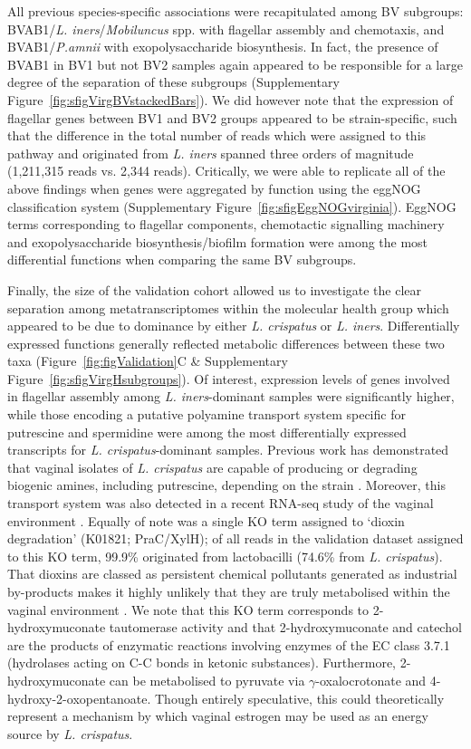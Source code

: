 \documentclass[sn-mathphys,Numbered]{sn-jnl}%
\begin{document}
All previous species-specific associations were recapitulated among BV subgroups: BVAB1/\textit{L. iners}/\textit{Mobiluncus} spp. with flagellar assembly and chemotaxis, and BVAB1/\textit{P.amnii} with exopolysaccharide biosynthesis. In fact, the presence of BVAB1 in BV1 but not BV2 samples again appeared to be responsible for a large degree of the separation of these subgroups (Supplementary Figure~\ref{fig:sfigVirgBVstackedBars}). We did however note that the expression of flagellar genes between BV1 and BV2 groups appeared to be strain-specific, such that the difference in the total number of reads which were assigned to this pathway and originated from \textit{L. iners} spanned three orders of magnitude (1,211,315 reads vs. 2,344 reads). Critically, we were able to replicate all of the above findings when genes were aggregated by function using the eggNOG classification system (Supplementary Figure~\ref{fig:sfigEggNOGvirginia}). EggNOG terms corresponding to flagellar components, chemotactic signalling machinery and exopolysaccharide biosynthesis/biofilm formation were among the most differential functions when comparing the same BV subgroups.

Finally, the size of the validation cohort allowed us to investigate the clear separation among metatranscriptomes within the molecular health group which appeared to be due to dominance by either \textit{L. crispatus} or \textit{L. iners}. Differentially expressed functions generally reflected metabolic differences between these two taxa (Figure~\ref{fig:figValidation}C \& Supplementary Figure~\ref{fig:sfigVirgHsubgroups}). Of interest, expression levels of genes involved in flagellar assembly among \textit{L. iners}-dominant samples were significantly higher, while those encoding a putative polyamine transport system specific for putrescine and spermidine were among the most differentially expressed transcripts for \textit{L. crispatus}-dominant samples. Previous work has demonstrated that vaginal isolates of \textit{L. crispatus} are capable of producing or degrading biogenic amines, including putrescine, depending on the strain \citep{puebla_barragan_amines_2021}. Moreover, this transport system was also detected in a recent RNA-seq study of the vaginal environment \citep{France:2022aa}. Equally of note was a single KO term assigned to `dioxin degradation' (K01821; PraC/XylH); of all reads in the validation dataset assigned to this KO term, 99.9\% originated from lactobacilli (74.6\% from \textit{L. crispatus}). That dioxins are classed as persistent chemical pollutants generated as industrial by-products makes it highly unlikely that they are truly metabolised within the vaginal environment \citep{hutzinger_sources_1985}. We note that this KO term corresponds to 2-hydroxymuconate tautomerase activity and that 2-hydroxymuconate and catechol are the products of enzymatic reactions involving enzymes of the EC class 3.7.1 (hydrolases acting on C-C bonds in ketonic substances). Furthermore, 2-hydroxymuconate can be metabolised to pyruvate via $\gamma$-oxalocrotonate and 4-hydroxy-2-oxopentanoate. Though entirely speculative, this could theoretically represent a mechanism by which vaginal estrogen may be used as an energy source by \textit{L. crispatus}.
\end{document}
